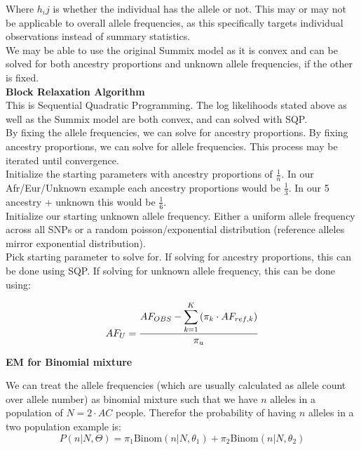 \documentclass[11pt,a4paper]{article}
\begin{document}
Where $h_ij$ is whether the individual has the allele or not. This may or may not be applicable to overall allele frequencies, as this specifically targets individual observations instead of summary statistics.\\

We may be able to use the original Summix model as it is convex and can be solved for both ancestry proportions and unknown allele frequencies, if the other is fixed.\\

\textbf{Block Relaxation Algorithm}\\

This is Sequential Quadratic Programming. The log likelihoods stated above as well as the Summix model are both convex, and can solved with SQP.\\

By fixing the allele frequencies, we can solve for ancestry proportions. By fixing ancestry proportions, we can solve for allele frequencies. This process may be iterated until convergence.\\

Initialize the starting parameters with ancestry proportions of $\frac{1}{n}$. In our Afr/Eur/Unknown example each ancestry proportions would be $\frac{1}{3}$.  In our 5 ancestry + unknown this would be $\frac{1}{6}$.\\

Initialize our starting unknown allele frequency. Either a uniform allele frequency across all SNPs or a random poisson/exponential distribution (reference alleles mirror exponential distribution).\\

Pick starting parameter to solve for. If solving for ancestry proportions, this can be done using SQP. If solving for unknown allele frequency, this can be done using:

$$ AF_U = \dfrac{AF_{OBS} - \mathlarger{\sum}_{k=1}^K \left( \pi_k \cdot AF_{ref,k} \right)}{\pi_u} $$

\textbf{EM for Binomial mixture}

We can treat the allele frequencies (which are usually calculated as allele count over allele number) as binomial mixture such that we have $n$ alleles in a population of $N = 2 \cdot AC$ people.  Therefor the probability of having $n$ alleles in a two population example is:\\

$$ P \left( n \vert N, \Theta \right) = \pi_1 \mbox{Binom} \left( n \vert N, \theta_1 \right) + \pi_2 \mbox{Binom} \left( n \vert N, \theta_2 \right) $$
\end{document}
